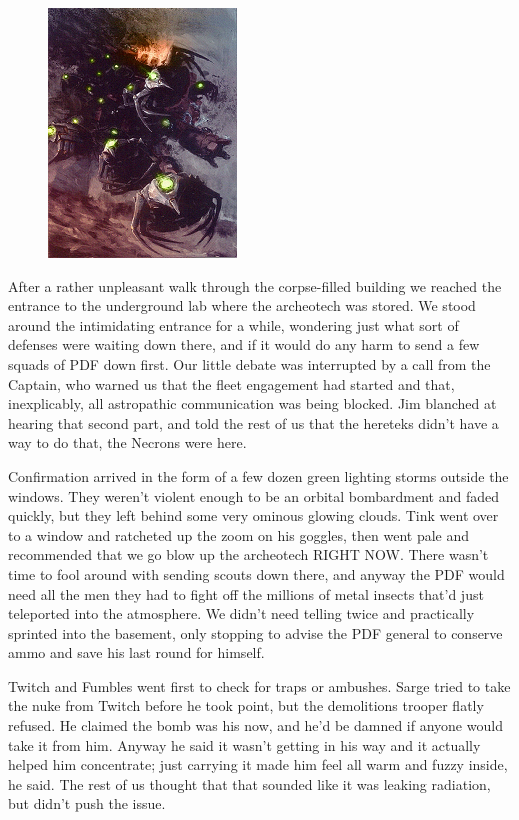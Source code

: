 \begin{figure}
	\begin{center}
		\includegraphics[width=\figwidth]{pics/11/76.png}
	\end{center}
\end{figure}
After a rather unpleasant walk through the corpse-filled building we reached the entrance to the underground lab where the archeotech was stored. 
We stood around the intimidating entrance for a while, wondering just what sort of defenses were waiting down there, and if it would do any harm to send a few squads of PDF down first. 
Our little debate was interrupted by a call from the Captain, who warned us that the fleet engagement had started and that, inexplicably, all astropathic communication was being blocked. 
Jim blanched at hearing that second part, and told the rest of us that the hereteks didn't have a way to do that, the Necrons were here.

Confirmation arrived in the form of a few dozen green lighting storms outside the windows. 
They weren't violent enough to be an orbital bombardment and faded quickly, but they left behind some very ominous glowing clouds. 
Tink went over to a window and ratcheted up the zoom on his goggles, then went pale and recommended that we go blow up the archeotech RIGHT NOW. 
There wasn't time to fool around with sending scouts down there, and anyway the PDF would need all the men they had to fight off the millions of metal insects that'd just teleported into the atmosphere. 
We didn't need telling twice and practically sprinted into the basement, only stopping to advise the PDF general to conserve ammo and save his last round for himself.

Twitch and Fumbles went first to check for traps or ambushes. 
Sarge tried to take the nuke from Twitch before he took point, but the demolitions trooper flatly refused. 
He claimed the bomb was his now, and he'd be damned if anyone would take it from him. 
Anyway he said it wasn't getting in his way and it actually helped him concentrate; 
just carrying it made him feel all warm and fuzzy inside, he said. 
The rest of us thought that that sounded like it was leaking radiation, but didn't push the issue.

